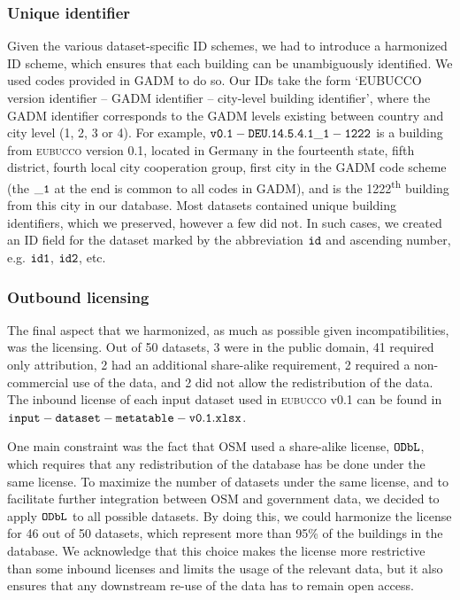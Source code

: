 \documentclass[fleqn,10pt]{wlscirep}
\begin{document}
\subsubsection*{Unique identifier}
Given the various dataset-specific ID schemes, we had to introduce a harmonized ID scheme, which ensures that each building can be unambiguously identified. We used codes provided in GADM to do so.  Our IDs take the form `EUBUCCO version identifier -- GADM identifier -- city-level building identifier', where the GADM identifier corresponds to the GADM levels existing between country and city level (1, 2, 3 or 4). For example, ${\tt v0.1-DEU.14.5.4.1\_1-1222}$ is a building from \textsc{eubucco} version 0.1, located in Germany in the fourteenth state, fifth district, fourth local city cooperation group, first city in the GADM code scheme (the ${\tt \_1}$ at the end is common to all codes in GADM), and is the 1222\textsuperscript{th} building from this city in our database. Most datasets contained unique building identifiers, which we preserved, however a few did not. In such cases, we created an ID field for the dataset marked by the abbreviation $\tt{id}$ and ascending number, e.g. $\tt{id1}$, $\tt{id2}$, etc.

\subsubsection*{Outbound licensing}

The final aspect that we harmonized, as much as possible given incompatibilities, was the licensing. Out of 50 datasets, 3 were in the public domain, 41 required only attribution, 2 had an additional share-alike requirement, 2 required a non-commercial use of the data, and 2 did not allow the redistribution of the data. The inbound license of each input dataset used in \textsc{eubucco} v0.1 can be found in ${\tt input-dataset-metatable-v0.1.xlsx}$.

One main constraint was the fact that OSM used a share-alike license, ${\tt ODbL}$, which requires that any redistribution of the database has be done under the same license. To maximize the number of datasets under the same license, and to facilitate further integration between OSM and government data, we decided to apply ${\tt ODbL}$ to all possible datasets. By doing this, we could harmonize the license for 46 out of 50 datasets, which represent more than 95\% of the buildings in the database. We acknowledge that this choice makes the license more restrictive than some inbound licenses and limits the usage of the relevant data, but it also ensures that any downstream re-use of the data has to remain open access.
\end{document}
